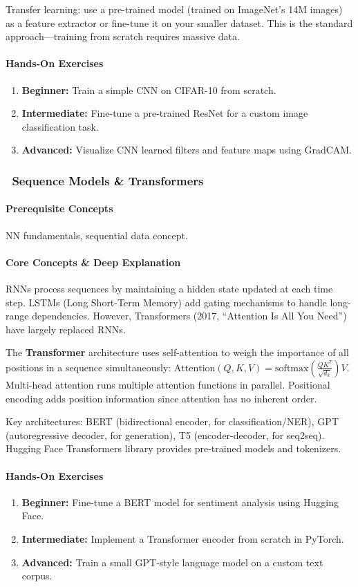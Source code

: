 \documentclass[11pt, a4paper, oneside]{report}
\newcommand{\mustmaster}[1]{\subsubsection{\texorpdfstring{\fcolorbox{blue!40!black}{blue!8}{\footnotesize\bfseries\color{blue!40!black} MUST MASTER}~#1}{#1}}}
\begin{document}
Transfer learning: use a pre-trained model (trained on ImageNet's 14M images) as a feature extractor or fine-tune it on your smaller dataset. This is the standard approach---training from scratch requires massive data.

\paragraph{Hands-On Exercises}
\begin{enumerate}[leftmargin=*]
\item \textbf{Beginner:} Train a simple CNN on CIFAR-10 from scratch.
\item \textbf{Intermediate:} Fine-tune a pre-trained ResNet for a custom image classification task.
\item \textbf{Advanced:} Visualize CNN learned filters and feature maps using GradCAM.
\end{enumerate}

\mustmaster{Sequence Models \& Transformers}

\paragraph{Prerequisite Concepts} NN fundamentals, sequential data concept.

\paragraph{Core Concepts \& Deep Explanation} RNNs process sequences by maintaining a hidden state updated at each time step. LSTMs (Long Short-Term Memory) add gating mechanisms to handle long-range dependencies. However, Transformers (2017, ``Attention Is All You Need'') have largely replaced RNNs.

The \textbf{Transformer} architecture uses self-attention to weigh the importance of all positions in a sequence simultaneously: $\text{Attention}(Q,K,V) = \text{softmax}\left(\frac{QK^T}{\sqrt{d_k}}\right)V$. Multi-head attention runs multiple attention functions in parallel. Positional encoding adds position information since attention has no inherent order.

Key architectures: BERT (bidirectional encoder, for classification/NER), GPT (autoregressive decoder, for generation), T5 (encoder-decoder, for seq2seq). Hugging Face Transformers library provides pre-trained models and tokenizers.

\paragraph{Hands-On Exercises}
\begin{enumerate}[leftmargin=*]
\item \textbf{Beginner:} Fine-tune a BERT model for sentiment analysis using Hugging Face.
\item \textbf{Intermediate:} Implement a Transformer encoder from scratch in PyTorch.
\item \textbf{Advanced:} Train a small GPT-style language model on a custom text corpus.
\end{enumerate}
\end{document}
